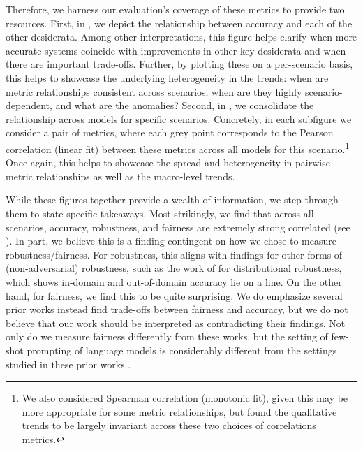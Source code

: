 Therefore, we harness our evaluation's coverage of these metrics to provide two resources.
First, in , we depict the relationship between accuracy and each of the \numnonaccuracymetriccategories other desiderata.
Among other interpretations, this figure helps clarify when more accurate systems coincide with improvements in other key desiderata and when there are important trade-offs.
Further, by plotting these on a per-scenario basis, this helps to showcase the underlying heterogeneity in the trends: when are metric relationships consistent across scenarios, when are they highly scenario-dependent, and what are the anomalies?
Second, in , we consolidate the relationship across models for specific scenarios.
Concretely, in each subfigure we consider a pair of metrics, where each grey point corresponds to the Pearson correlation (\ie linear fit) between these metrics across all models for this scenario.\footnote{We also considered Spearman correlation (\ie monotonic fit), given this may be more appropriate for some metric relationships, but found the qualitative trends to be largely invariant across these two choices of correlations metrics.}
Once again, this helps to showcase the spread and heterogeneity in pairwise metric relationships as well as the macro-level trends.

While these figures together provide a wealth of information, we step through them to state specific takeaways.
Most strikingly, we find that across all scenarios, accuracy, robustness, and fairness are extremely strong correlated (see ).
In part, we believe this is a finding contingent on how we chose to measure robustness/fairness.
For robustness, this aligns with findings for other forms of (non-adversarial) robustness, such as the work of \citet{miller2021line} for distributional robustness, which shows in-domain and out-of-domain accuracy lie on a line.
On the other hand, for fairness, we find this to be quite surprising.
We do emphasize several prior works instead find trade-offs between fairness and accuracy, but we do not believe that our work should be interpreted as contradicting their findings.
Not only do we measure fairness differently from these works, but the setting of few-shot prompting of language models is considerably different from the settings studied in these prior works \citep{zhang2019theoretically, raghunathan2020understanding, dutta2020tradeoff, wang2021understanding, zhao2022inherent}. 

